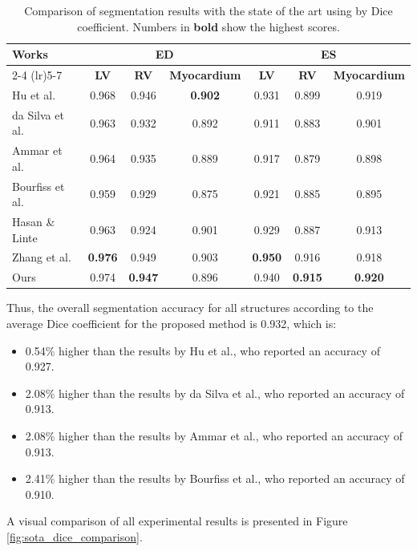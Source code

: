 \documentclass[fleqn,10pt]{wlscirep}
\begin{document}
\begin{table}[ht]
\centering
\caption{Comparison of segmentation results with the state of the art using by Dice coefficient. Numbers in \textbf{bold} show the highest scores.}
\label{tab:segmentation_comparison_sota}
\begin{tabular}{lcccccc}
\toprule
\textbf{Works} & \multicolumn{3}{c}{\textbf{ED}} & \multicolumn{3}{c}{\textbf{ES}} \\
\cmidrule(lr){2-4} \cmidrule(lr){5-7}
 & \textbf{LV} & \textbf{RV} & \textbf{Myocardium} & \textbf{LV} & \textbf{RV} & \textbf{Myocardium} \\
\midrule
Hu et al. \cite{Hu:2023} & 0.968 & 0.946 & \textbf{0.902} & 0.931 & 0.899 & 0.919 \\
da Silva et al. \cite{daSilva:2024} & 0.963 & 0.932 & 0.892 & 0.911 & 0.883 & 0.901 \\
Ammar et al. \cite{Ammar:2021} & 0.964 & 0.935 & 0.889 & 0.917 & 0.879 & 0.898 \\
Bourfiss et al. \cite{Bourfiss:2023} & 0.959 & 0.929 & 0.875 & 0.921 & 0.885 & 0.895 \\
Hasan \& Linte \cite{Hasan:2020} & 0.963 & 0.924 & 0.901 & 0.929 & 0.887 & 0.913 \\
Zhang et al. \cite{Zhang:2022} & \textbf{0.976} & 0.949 & 0.903 & \textbf{0.950} & 0.916 & 0.918 \\
Ours & 0.974 & \textbf{0.947} & 0.896 & 0.940 & \textbf{0.915} & \textbf{0.920} \\
\bottomrule
\end{tabular}
\end{table}

Thus, the overall segmentation accuracy for all structures according to the average Dice coefficient for the proposed method is 0.932, which is:

\begin{itemize}
    \item 0.54\% higher than the results by Hu et al., who reported an accuracy of 0.927.
    \item 2.08\% higher than the results by da Silva et al., who reported an accuracy of 0.913.
    \item 2.08\% higher than the results by Ammar et al., who reported an accuracy of 0.913.
    \item 2.41\% higher than the results by Bourfiss et al., who reported an accuracy of 0.910.
\end{itemize}

A visual comparison of all experimental results is presented in Figure \ref{fig:sota_dice_comparison}.
\end{document}
